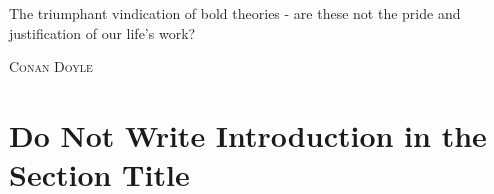 \epigraph{The triumphant vindication of bold theories - are these not the pride and justification of our life's work?}%
{\textsc{Conan Doyle}}
\null\vfill
\newpage
\blankpagewithnumber
\section{Do Not Write Introduction in the Section Title}
\lipsum[1]
\cite{song2000practical, CurtmolaGKO06, goh2003secure, cash2013highly, cash2014dynamic, cash2014locality, kamara2012dynamic,kamara2013parallel,kamara2017boolean,kamara2018encrypted,lai2017forward,lai2018result,patranabis2021forward,ChamaniPPJ18, bost2017forward, Bost16}

\newpage
\blankpagewithnumber
